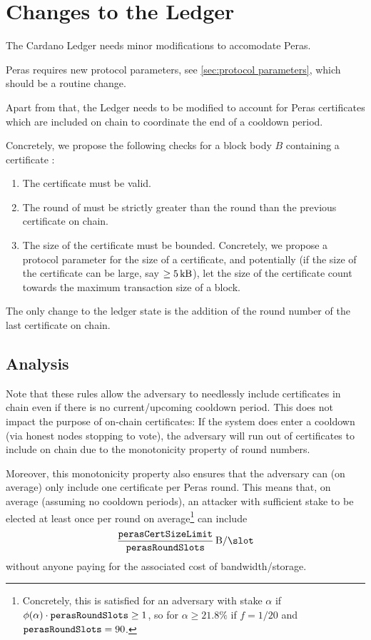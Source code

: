 \section{Changes to the Ledger}

The Cardano Ledger \parencite{shelley-ledger-specs,cardano-formal-ledger-specs} needs minor modifications to accomodate Peras.

Peras requires new protocol parameters, see \cref{sec:protocol parameters}, which should be a routine change.

Apart from that, the Ledger needs to be modified to account for Peras certificates which are included on chain to coordinate the end of a cooldown period.

Concretely, we propose the following checks for a block body $B$ containing a certificate \cert{}:
\begin{enumerate}
\item
  The certificate \cert{} must be valid.
\item
  The round of \cert{} must be strictly greater than the round than the previous certificate on chain.
\item
  The size of the certificate must be bounded.
  Concretely, we propose a protocol parameter \perasCertSizeLimit{} for the size of a certificate, and potentially (if the size of the certificate can be large, say $\ge\SI{5}{\kilo\byte}$), let the size of the certificate count towards the maximum transaction size of a block.
\end{enumerate}
The only change to the ledger state is the addition of the round number of the last certificate on chain.

\subsection{Analysis}
Note that these rules allow the adversary to needlessly include certificates in chain even if there is no current/upcoming cooldown period.
This does not impact the purpose of on-chain certificates:
If the system does enter a cooldown (via honest nodes stopping to vote), the adversary will run out of certificates to include on chain due to the monotonicity property of round numbers.

Moreover, this monotonicity property also ensures that the adversary can (on average) only include one certificate per Peras round.
This means that, on average (assuming no cooldown periods), an attacker with sufficient stake to be elected at least once per round on average\footnote{Concretely, this is satisfied for an adversary with stake $\alpha$ if $\phi(\alpha)\cdot\mathtt{perasRoundSlots} \ge 1$, so for $\alpha \ge 21.8\%$ if $f=1/20$ and $\mathtt{perasRoundSlots}=90$.} can include
\[\frac \perasCertSizeLimit \perasRoundSlots\,\unit{B/\slot}\]
without anyone paying for the associated cost of bandwidth/storage.

